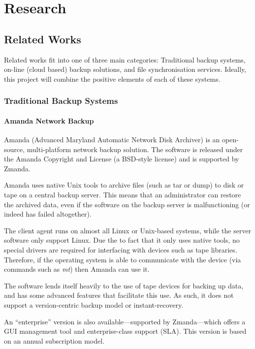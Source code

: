 \chapter{Research}

\section{Related Works}

Related works fit into one of three main categories: Traditional backup
systems, on-line (cloud based) backup solutions, and file synchronisation
services. Ideally, this project will combine the positive elements of each of
these systems.

\subsection{Traditional Backup Systems}

\subsubsection{Amanda Network Backup}

Amanda (Advanced Maryland Automatic Network Disk Archiver) is an open-source,
multi-platform network backup solution\cite{AMANDA-about}. The software is
released under the Amanda Copyright and License (a BSD-style license) and is
supported by Zmanda\cite{AMANDA-license}.

Amanda uses native Unix tools to archive files (such as tar or dump) to disk or
tape on a central backup server. This means that an administrator can restore
the archived data, even if the software on the backup server is malfunctioning
(or indeed has failed altogether).

The client agent runs on almost all Linux or Unix-based systems, while the
server software only support Linux. Due the to fact that it only uses native
tools, no special drivers are required for interfacing with devices such as
tape libraries. Therefore, if the operating system is able to communicate with
the device (via commands such as \emph{mt}) then Amanda can use
it\cite{AMANDA-about}.

The software lends itself heavily to the use of tape devices for backing up
data, and has some advanced features that facilitate this use. As such, it does
not support a version-centric backup model or
instant-recovery\cite{AMANDA-about}.

An ``enterprise'' version is also available---supported by Zmanda---which
offers a GUI management tool and enterprise-class support (SLA).  This version
is based on an annual subscription model\cite{AMANDA-ent}.

